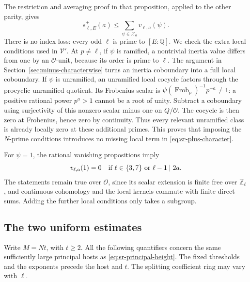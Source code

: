 The restriction and averaging proof in that proposition, applied
to the other parity, gives
\begin{equation}\label{eq:sr-plus-character}
 s^+_{\ell,E}(a)\leq
             \sum_{\psi\in\mathcal X_a}v_{\ell,a}(\psi).
\end{equation}
There is no index loss: every odd \(\ell\) is prime to
\([E:\mathbb Q]\).
We check the extra local conditions used in \(\mathcal V'\).
At \(p\ne\ell\), if \(\psi\) is ramified, a nontrivial inertia
value differs from one by an \(\mathcal O\)-unit, because its
order is prime to \(\ell\).
The argument in Section~\ref{sec:minus-characterwise} turns an
inertia coboundary into a full local coboundary.
If \(\psi\) is unramified, an unramified local cocycle factors
through the procyclic unramified quotient.
Its Frobenius scalar is \(\psi(\operatorname{Frob}_p)^{-1}p^{-a}\ne1\):
a positive rational power \(p^a>1\) cannot be a root of unity.
Subtract a coboundary using surjectivity of this nonzero scalar
minus one on \(Q/\mathcal O\). The cocycle is then zero at
Frobenius, hence zero by continuity.
Thus every relevant unramified class is already locally zero
at these additional primes. This proves that imposing the
\(N\)-prime conditions introduces no missing local term in
\eqref{eq:sr-plus-character}.

For \(\psi=1\), the rational vanishing propositions imply
\[
 v_{\ell,a}(1)=0\quad
 \hbox{if }\ell\in\{3,7\}\ \hbox{or }\ell-1\mid2a .
\]
The statements remain true over \(\mathcal O\), since its scalar
extension is finite free over \(\mathbb Z_\ell\), and continuous
cohomology and the local kernels commute with finite direct sums.
Adding the further local conditions only takes a subgroup.

\subsection{The two uniform estimates}
Write \(M=Nt\), with \(t\geq2\).
All the following quantifiers concern the same sufficiently large
principal hosts as \eqref{eq:sr-principal-height}.
The fixed thresholds and the exponents precede the host and \(t\).
The splitting coefficient ring may vary with \(\ell\).

